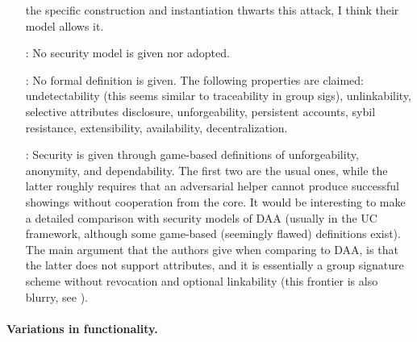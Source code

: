 \begin{enumerate}
  the specific construction and instantiation thwarts this attack, I think their
  model allows it.
\item[\cite{sms+19}:] No security model is given nor adopted.
\item[\cite{halp20}:] No formal definition is given. The following properties
  are claimed: undetectability (this seems similar to traceability in group sigs),
  unlinkability, selective attributes disclosure, unforgeability, persistent
  accounts, sybil resistance, extensibility, availability, decentralization.
\item[\cite{hs21}:] Security is given through game-based definitions of
  unforgeability, anonymity, and dependability. The first two are the usual ones,
  while the latter roughly requires that an adversarial helper cannot produce
  successful showings without cooperation from the core. It would be interesting
  to make a detailed comparison with security models of DAA (usually in the UC
  framework, although some game-based (seemingly flawed) definitions exist).
  The main argument that the authors give when comparing to DAA, is that the
  latter does not support attributes, and it is essentially a group signature
  scheme without revocation and optional linkability (this frontier is also
  blurry, see \cite{dl21}).
\end{enumerate}

\paragraph{Variations in functionality.}

